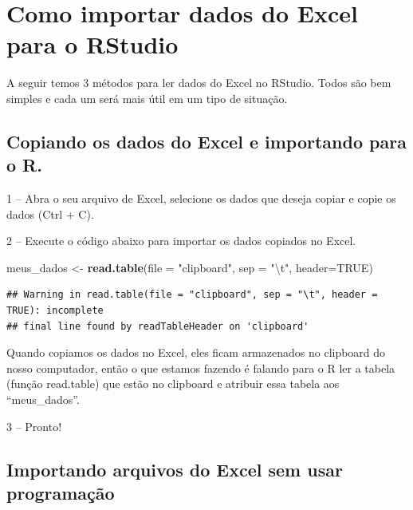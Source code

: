 \documentclass[
]{book}
\newenvironment{Shaded}{\begin{snugshade}}{\end{snugshade}}
\newcommand{\CharTok}[1]{\textcolor[rgb]{0.31,0.60,0.02}{#1}}
\newcommand{\DataTypeTok}[1]{\textcolor[rgb]{0.13,0.29,0.53}{#1}}
\newcommand{\KeywordTok}[1]{\textcolor[rgb]{0.13,0.29,0.53}{\textbf{#1}}}
\newcommand{\NormalTok}[1]{#1}
\newcommand{\OtherTok}[1]{\textcolor[rgb]{0.56,0.35,0.01}{#1}}
\newcommand{\StringTok}[1]{\textcolor[rgb]{0.31,0.60,0.02}{#1}}
\begin{document}
\hypertarget{como-importar-dados-do-excel-para-o-rstudio}{%
\section{Como importar dados do Excel para o
RStudio}\label{como-importar-dados-do-excel-para-o-rstudio}}

A seguir temos 3 métodos para ler dados do Excel no RStudio. Todos são
bem simples e cada um será mais útil em um tipo de situação.

\hypertarget{copiando-os-dados-do-excel-e-importando-para-o-r.}{%
\subsection{Copiando os dados do Excel e importando para o
R.}\label{copiando-os-dados-do-excel-e-importando-para-o-r.}}

1 -- Abra o seu arquivo de Excel, selecione os dados que deseja copiar e
copie os dados (Ctrl + C).

2 -- Execute o código abaixo para importar os dados copiados no Excel.

\begin{Shaded}
\begin{Highlighting}[]
\NormalTok{meus_dados <-}\StringTok{ }\KeywordTok{read.table}\NormalTok{(}\DataTypeTok{file =} \StringTok{"clipboard"}\NormalTok{, }\DataTypeTok{sep =} \StringTok{"}\CharTok{\textbackslash{}t}\StringTok{"}\NormalTok{, }\DataTypeTok{header=}\OtherTok{TRUE}\NormalTok{)}
\end{Highlighting}
\end{Shaded}

\begin{verbatim}
## Warning in read.table(file = "clipboard", sep = "\t", header = TRUE): incomplete
## final line found by readTableHeader on 'clipboard'
\end{verbatim}

Quando copiamos os dados no Excel, eles ficam armazenados no clipboard
do nosso computador, então o que estamos fazendo é falando para o R ler
a tabela (função read.table) que estão no clipboard e atribuir essa
tabela aos ``meus\_dados''.

3 -- Pronto!

\hypertarget{importando-arquivos-do-excel-sem-usar-programauxe7uxe3o}{%
\subsection{Importando arquivos do Excel sem usar
programação}\label{importando-arquivos-do-excel-sem-usar-programauxe7uxe3o}}
\end{document}

